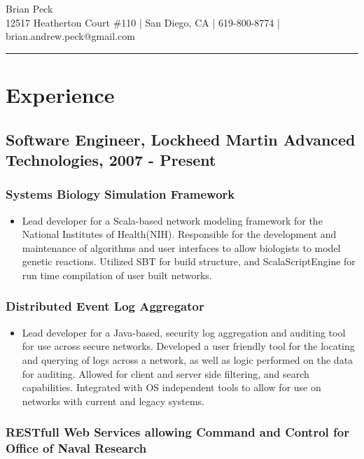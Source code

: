 \documentclass[11pt]{article}
\title{}
\date{}
\begin{document}
\begin{center}
{\huge Brian Peck} \\
12517 Heatherton Court \#110 | San Diego, CA | 619-800-8774 | brian.andrew.peck@gmail.com
\hrule
\end{center}

\section*{Experience}
\label{sec-1}

\subsection*{Software Engineer, Lockheed Martin Advanced Technologies, 2007 - Present}
\label{sec-1.1}

\subsubsection*{Systems Biology Simulation Framework}
\label{sec-1.1.1}

\begin{itemize}
\item Lead developer for a Scala-based network modeling framework for the National Institutes of Health(NIH). Responsible for the development and maintenance of algorithms and user interfaces to allow biologists to model genetic reactions. Utilized SBT for build structure, and ScalaScriptEngine for run time compilation of user built networks.
\end{itemize}
\subsubsection*{Distributed Event Log Aggregator}
\label{sec-1.1.2}

\begin{itemize}
\item Lead developer for a Java-based, security log aggregation and auditing tool for use across secure networks. Developed a user friendly tool for the locating and querying of logs across a network, as well as logic performed on the data for auditing. Allowed for client and server side filtering, and search capabilities. Integrated with OS independent tools to allow for use on networks with current and legacy systems.
\end{itemize}
\subsubsection*{RESTfull Web Services allowing Command and Control for Office of Naval Research}
\label{sec-1.1.3}
\end{document}

